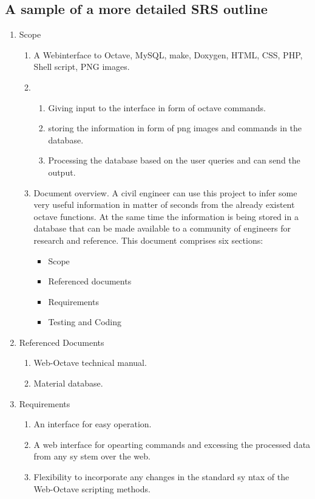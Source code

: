 \subsection*{A sample of a more detailed SRS outline}
\begin{enumerate}
\item Scope  
	\begin{enumerate}
	\item A Webinterface to Octave, MySQL,
		make, Doxygen, HTML, CSS, PHP,
		Shell script, PNG
		images.
		\item
		\begin{enumerate}
		\item  Giving input to the interface in form of octave commands. \\
		\item  storing the information in form of png images and commands
		in the database. \\
		\item Processing the database
		based on the user queries and
		can send the output.
		 		\end{enumerate}
		\item  Document overview.
		A civil engineer can use this
		project to infer some very
		 useful
		information in matter of seconds
		from the already
		 existent
		octave functions. At the same
		time the information is being
		stored in a database that can be
		made available to a community
		of engineers for research and
		reference.
		This document comprises six
		sections:
		\begin{itemize}
		\item Scope
		\item Referenced documents
		\item Requirements
		\item Testing and Coding 
				\end{itemize}
\end{enumerate}


\item Referenced Documents 
\begin{enumerate}
\item Web-Octave technical
manual.
\item Material database.
\end{enumerate} 
\item Requirements 
\begin{enumerate}
\item An interface for easy operation.
\item A web interface for opearting commands and excessing the processed
data from any
 sy
stem over the
web.
\item Flexibility
 to incorporate any
changes in the standard sy
ntax of
the Web-Octave scripting
methods. 

\end{enumerate}
\end{enumerate}


